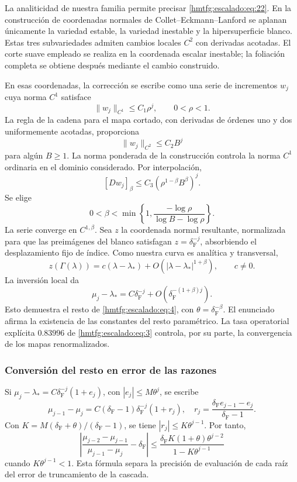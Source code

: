 La analiticidad de nuestra familia permite precisar \eqref{hmtfg:escalado:eq:22}. En la construcción de coordenadas normales de Collet–Eckmann–Lanford se aplanan únicamente la variedad estable, la variedad inestable y la hipersuperficie blanco. Estas tres subvariedades admiten cambios locales \(C^2\) con derivadas acotadas. El corte suave empleado se realiza en la coordenada escalar inestable; la foliación completa se obtiene después mediante el cambio construido.

En esas coordenadas, la corrección se escribe como una serie de incrementos \(w_j\) cuya norma \(C^1\) satisface
\[
\|w_j\|_{C^1}\le C_1\rho^j,\qquad 0<\rho<1.
\]
La regla de la cadena para el mapa cortado, con derivadas de órdenes uno y dos uniformemente acotadas, proporciona
\[
\|w_j\|_{C^2}\le C_2B^j
\]
para algún \(B\ge1\). La norma ponderada de la construcción controla la norma \(C^1\) ordinaria en el dominio considerado. Por interpolación,
\[
[Dw_j]_\beta\le C_3
\left(\rho^{1-\beta}B^\beta\right)^j.
\]
Se elige
\begin{equation}
0<\beta<\min\left\{1,
\frac{-\log\rho}{\log B-\log\rho}\right\}.
\label{hmtfg:escalado:eq:23}
\end{equation}
La serie converge en \(C^{1,\beta}\). Sea \(z\) la coordenada normal resultante, normalizada para que las preimágenes del blanco satisfagan \(z=\delta_{\mathrm F}^{-j}\), absorbiendo el desplazamiento fijo de índice. Como nuestra curva es analítica y transversal,
\[
z(\Gamma(\lambda))=c(\lambda-\lambda_*)
+O(|\lambda-\lambda_*|^{1+\beta}),\qquad c\ne0.
\]
La inversión local da
\begin{equation}
\mu_j-\lambda_*=C\delta_{\mathrm F}^{-j}
+O\left(\delta_{\mathrm F}^{-(1+\beta)j}\right).
\label{hmtfg:escalado:eq:24}
\end{equation}
Esto demuestra el resto de \eqref{hmtfg:escalado:eq:4}, con \(\theta=\delta_{\mathrm F}^{-\beta}\). El enunciado afirma la existencia de las constantes del resto paramétrico. La tasa operatorial explícita \(0.83996\) de \eqref{hmtfg:escalado:eq:3} controla, por su parte, la convergencia de los mapas renormalizados.

\subsubsection{Conversión del resto en error de las razones}

Si \(\mu_j-\lambda_*=C\delta_{\mathrm F}^{-j}(1+e_j)\), con \(|e_j|\le M\theta^j\), se escribe
\[
\mu_{j-1}-\mu_j=C(\delta_{\mathrm F}-1)\delta_{\mathrm F}^{-j}(1+r_j),
\quad
r_j=\frac{\delta_{\mathrm F} e_{j-1}-e_j}{\delta_{\mathrm F}-1}.
\]
Con \(K=M(\delta_{\mathrm F}+\theta)/(\delta_{\mathrm F}-1)\), se tiene \(|r_j|\le K\theta^{j-1}\). Por tanto,
\begin{equation}
\boxed{
\left|\frac{\mu_{j-2}-\mu_{j-1}}{\mu_{j-1}-\mu_j}-\delta_{\mathrm F}\right|
\le\frac{\delta_{\mathrm F} K(1+\theta)\theta^{j-2}}
{1-K\theta^{j-1}}}
\label{hmtfg:escalado:eq:25}
\end{equation}
cuando \(K\theta^{j-1}<1\). Esta fórmula separa la precisión de evaluación de cada raíz del error de truncamiento de la cascada.


